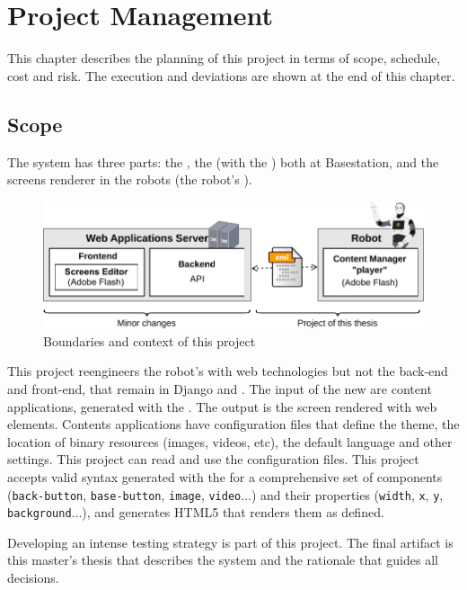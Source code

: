 \chapter{Project Management}
This chapter describes the planning of this project in terms of scope, schedule, cost and risk.
The execution and deviations are shown at the end of this chapter.

\section{Scope}
\label{sec:scope}
The system has three parts: the \flangobe, the \flangofe (with the \se) both at Basestation, and the screens renderer in the robots (the robot's \cm {}).

\begin{figure}[htb]
    \centering
    \includegraphics{figures/intro-system-overview.pdf}
    \caption{Boundaries and context of this project}
    \label{fig:system-overview}
\end{figure}

This project reengineers the robot's \cm with web technologies but not the back-end and front-end, that remain in Django and \flash.
The input of the new \cm are content applications, generated with the \se . The output is the screen rendered with web elements.
Contents applications have configuration files that define the theme, the location of binary resources (images, videos, etc), the default language and other settings. 
This project can read and use the configuration files.
This project accepts valid syntax generated with the \se for a comprehensive set of components (\texttt{back-button}, \texttt{base-button}, \texttt{image}, \texttt{video}...) and their properties (\texttt{width}, \texttt{x}, \texttt{y}, \texttt{background}...), and generates \ac{HTML5} that renders them as defined.

Developing an intense testing strategy is part of this project.
The final artifact is this master's thesis that describes the system and the rationale that guides all decisions.

